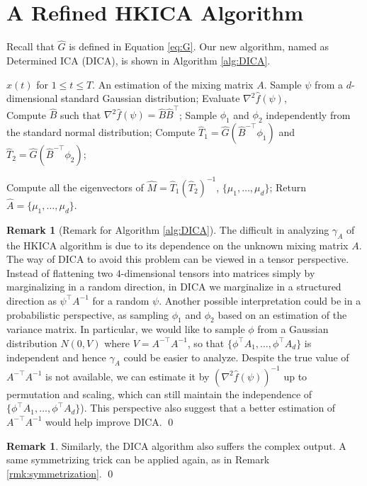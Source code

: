 \documentclass[twoside]{article}
\theoremstyle{definition}
\newtheorem{remark}[lemma]{Remark}
\begin{document}
\section{A Refined HKICA Algorithm}
\label{sec:DICA}
Recall that $\widehat{G}$ is defined in Equation \eqref{eq:G}.
Our new algorithm, named as Determined ICA (DICA), is shown in Algorithm \ref{alg:DICA}. 
\begin{algorithm}
\caption{Determined ICA (DICA)}
\label{alg:DICA}
\begin{algorithmic}[1]
\INPUT $x(t)$ for $1\le t \le T$. 
\OUTPUT An estimation of the mixing matrix $A$. 
\STATE Sample $\psi$ from a $d$-dimensional standard Gaussian distribution;
\STATE Evaluate $\nabla^2\widehat{f}(\psi)$, \\
\STATE Compute $\widehat{B}$ such that $\nabla^2\widehat{f}(\psi) = \widehat{B}\widehat{B}^{\top}$;
\STATE Sample $\phi_1$ and $\phi_2$ independently from the standard normal distribution;
\STATE Compute $\widehat{T}_1 = \widehat{G}(\widehat{B}^{-\top}\phi_1)$ and  $\widehat{T}_2 =\widehat{G}(\widehat{B}^{-\top}\phi_2)$;

\STATE Compute all the eigenvectors of $\widehat{M} = \widehat{T}_1\left(\widehat{T}_2\right)^{-1}$, $\{\mu_1,\ldots,\mu_d\}$;
\STATE Return $\widehat{A} = \{\mu_1,\ldots,\mu_d\}$.
\end{algorithmic}
\end{algorithm}
\begin{remark}[Remark for Algorithm \ref{alg:DICA}]
The difficult in analyzing $\gamma_A$ of the HKICA algorithm is due to its dependence on the unknown mixing matrix $A$. 
The way of DICA to avoid this problem can be viewed in a tensor perspective. 
Instead of flattening two $4$-dimensional tensors into matrices simply by marginalizing in a random direction, in DICA we marginalize in a structured direction as $\psi^{\top}A^{-1}$ for a random $\psi$. 
Another possible interpretation could be in a  probabilistic perspective, as sampling $\phi_1$ and $\phi_2$ based on an estimation of the variance matrix. 
In particular, we would like to sample $\phi$ from a Gaussian distribution $N(0,V)$ where $V = A^{-\top}A^{-1}$, so that $\{\phi^{\top}A_1, \ldots, \phi^{\top}A_d \}$ is independent and hence $\gamma_A$ could be easier to analyze. 
Despite the true value of $A^{-\top}A^{-1}$ is not available, we can estimate it by $\left(\nabla^2\widehat{f}(\psi)\right)^{-1}$ up to permutation and scaling,
which can still maintain the independence of $\{\phi^{\top}A_1, \ldots, \phi^{\top}A_d \}$). 
This perspective also suggest that a better estimation of $A^{-\top}A^{-1}$ would help improve DICA. \qed
\end{remark}
\begin{remark}
Similarly, the DICA algorithm also suffers the complex output. 
A same symmetrizing trick can be applied again, as in Remark \ref{rmk:symmetrization}. \qed 
\end{remark}
\end{document}
